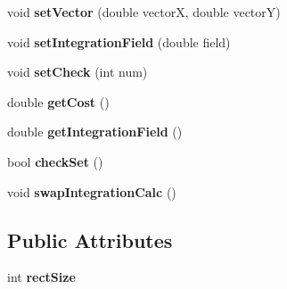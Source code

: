\begin{DoxyCompactItemize}
\item 
\mbox{\label{class_node_af93f2231cdb17bec0ff4d77972aefc82}} 
void {\bfseries set\+Vector} (double vectorX, double vectorY)
\item 
\mbox{\label{class_node_ae93169d2d1e75142b35699b22804ab82}} 
void {\bfseries set\+Integration\+Field} (double field)
\item 
\mbox{\label{class_node_a88680b24156b672fc7cb3598e03b065b}} 
void {\bfseries set\+Check} (int num)
\item 
\mbox{\label{class_node_a6598ebb34ab252ac0258b32a78f689d0}} 
double {\bfseries get\+Cost} ()
\item 
\mbox{\label{class_node_a1d3e51a36ef8794ca73d3be104ba792c}} 
double {\bfseries get\+Integration\+Field} ()
\item 
\mbox{\label{class_node_a7888accf4c497dbc71e5f55f8c75a5e4}} 
bool {\bfseries check\+Set} ()
\item 
\mbox{\label{class_node_ae5153ca337211f2dc2ec3b88aecd1063}} 
void {\bfseries swap\+Integration\+Calc} ()
\end{DoxyCompactItemize}
\subsection*{Public Attributes}
\begin{DoxyCompactItemize}
\item 
\mbox{\label{class_node_a2e322c34152537dd2bec43ad60e1be0b}} 
int {\bfseries rect\+Size}
\end{DoxyCompactItemize}
